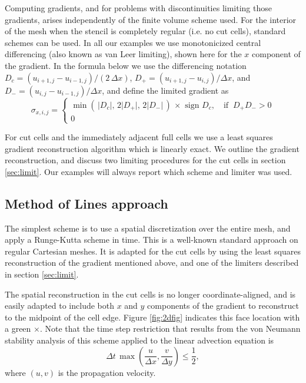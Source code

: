 Computing gradients, and for problems with discontinuities limiting
those gradients, arises independently of the finite volume scheme used. 
For the interior of the mesh when the stencil is completely regular (i.e. no cut
cells), standard schemes can be used.
In all our examples we use monotonicized central differencing (also known
as van Leer limiting), shown here for the $x$
component of the gradient. In the formula below we use the differencing notation
$D_c = (u_{i+1,j}-u_{i-1,j})/(2 \, \Delta x)$,
$D_+ = (u_{i+1,j}-u_{i,j})/\Delta x$, and
$D_- = (u_{i,j}-u_{i-1,j})/\Delta x$, and define the limited gradient as
\begin{equation}
\sigma_{x,i,j} =  \begin{cases} 
                       \min \left ( \,  \lvert{ D_c}\rvert,\,
                       2 \lvert {D_+}\rvert,\,
                      2 \lvert{D_-}\rvert \,  \right ) \,\times 
                      \text{ sign } D_c, \quad \text{if} \;\;  D_+ D_- >  0\\
                      0
                      \end{cases}
\end{equation}

For cut cells and the immediately adjacent full cells we use a least squares gradient reconstruction algorithm which is
linearly exact.  We outline the gradient reconstruction, and
discuss two  limiting procedures for the cut cells in 
section \ref{sec:limit}. Our examples will always report which scheme and
limiter was used.


\subsection{Method of Lines approach}
The simplest scheme is to use a spatial discretization over the entire
mesh, and apply a Runge-Kutta scheme in time. This is a well-known
standard approach
on regular Cartesian meshes. It is adapted for the cut cells by
using the  least squares reconstruction of the gradient mentioned above, and one of
the limiters described in section \ref{sec:limit}.

The spatial reconstruction in the cut cells is no longer
coordinate-aligned, and is easily adapted to  
include both $x$ and $y$ components of the gradient to 
reconstruct to the midpoint of the cell edge. 
Figure \ref{fig:2dfig}  indicates this face location with a green $\times$.
Note that the time step restriction that results from the von Neumann 
stability analysis of this scheme applied to the linear advection equation is
\begin{equation}
\Delta t \,  \max\left(\frac{u}{\Delta x},\frac{v}{\Delta y}\right) \leq \frac{1}{2} ,
\end{equation}
where $(u,v)$ is the propagation velocity.  

